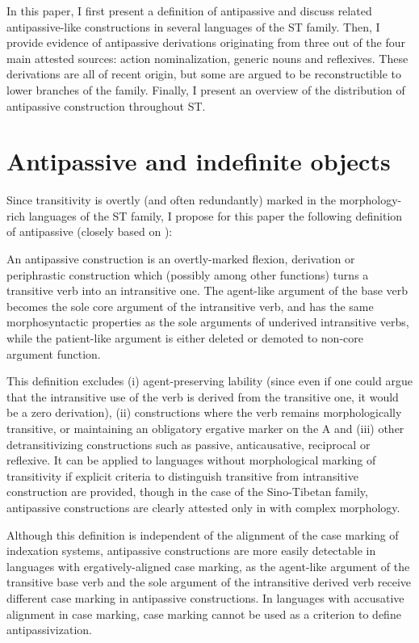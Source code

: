 \documentclass[oneside,a4paper,11pt]{article}
\begin{document}
In this paper, I first present a definition of antipassive and discuss related antipassive-like constructions in several languages of the ST family. Then, I provide evidence of antipassive derivations originating from three out of the four main attested sources: action nominalization, generic nouns and reflexives. These derivations are all of recent origin, but some are argued to be reconstructible to lower branches of the family. Finally, I present an overview of the distribution of antipassive construction throughout ST.

\section{Antipassive and indefinite objects}
Since transitivity is overtly (and often redundantly) marked in the morphology-rich languages of the ST family, I propose for this paper the following definition of antipassive (closely based on \citealt[146]{dixon94erg}):

\begin{exe}
\ex \label{ex:def}
\glt An antipassive construction is an overtly-marked flexion, derivation or periphrastic construction which (possibly among other functions) turns a transitive verb into an intransitive one. The agent-like argument of the base verb becomes the sole core argument of the intransitive verb, and has the same morphosyntactic properties as the sole arguments of underived intransitive verbs, while the patient-like argument is either deleted or demoted to non-core argument function.
\end{exe}

This definition excludes  (i) agent-preserving lability (since even if one could argue that the intransitive use of the verb is derived from the transitive one, it would be a zero derivation), (ii) constructions where the verb remains morphologically transitive, or maintaining an obligatory ergative marker on the A and (iii) other detransitivizing constructions such as passive, anticausative, reciprocal or reflexive. It can be applied to languages without morphological marking of transitivity if explicit criteria to distinguish transitive from intransitive construction are provided, though in the case of the Sino-Tibetan family, antipassive constructions are clearly attested only in with complex morphology. 

Although this definition is independent of the alignment of the case marking of indexation systems, antipassive constructions are more easily detectable in languages with ergatively-aligned case marking, as the agent-like argument of the transitive base verb and the sole argument of the intransitive derived verb receive different case marking in antipassive constructions. In languages with accusative alignment in case marking, case marking cannot be used as a criterion to define antipassivization.
\end{document}
